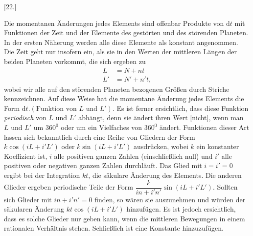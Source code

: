 \par{}\bigskip
{}
\begin{center}[22.]\end{center}
\begingroup
\setlength{\lineskip}{4pt}\setlength{\lineskiplimit}{4pt}
\noindent\hspace*{\parindent}Die momentanen Änderungen jedes Elements sind offenbar Produkte von \(\mathrm{d}t\) mit Funktionen der Zeit und der Elemente des gestörten und des störenden Planeten. In der ersten Näherung werden alle diese Elemente als konstant angenommen. Die Zeit geht nur insofern ein, als sie in den Werten der mittleren Längen der beiden Planeten vorkommt, die sich ergeben zu
\[
\begin{aligned}
L&=N+nt\\
L'&=N'+n't,
\end{aligned}
\]
wobei wir alle auf den störenden Planeten bezogenen Größen durch Striche kennzeichnen. Auf diese Weise hat die momentane Änderung jedes Elements die Form \(\mathrm{d}t.(\text{Funktion von }L\text{ und }L')\). Es ist ferner ersichtlich, dass diese Funktion \textit{periodisch} von \(L\text{ und }L'\) abhängt, denn sie ändert ihren Wert [nicht], wenn man \(L\text{ und }L'\) um \(360^{0}\) oder um ein Vielfaches von \(360^{0}\) ändert. Funktionen dieser Art lassen sich bekanntlich durch eine Reihe von Gliedern der Form \(k\cos(iL+i'L')\) oder \(k\sin(iL+i'L')\) ausdrücken, wobei \(k\) ein konstanter Koeffizient ist, \(i\) alle positiven ganzen Zahlen (einschließlich null) und \(i'\) alle positiven oder negativen ganzen Zahlen durchläuft. Das Glied mit \(i=i'=0\) ergibt bei der Integration \(kt\), die säkulare Änderung des Elements. Die anderen Glieder ergeben periodische Teile der Form \(\dfrac{k}{in+i'n'}\sin(iL+i'L')\). Sollten sich Glieder mit \(in+i'n'=0\) finden, so wären sie auszunehmen und würden der säkularen Änderung \(kt\cos(iL+i'L')\) hinzufügen. Es ist jedoch ersichtlich, dass es solche Glieder nur geben kann, wenn die mittleren Bewegungen in einem rationalen Verhältnis stehen. Schließlich ist eine Konstante hinzuzufügen.
\par\endgroup
